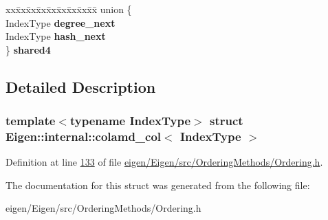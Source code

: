 \begin{DoxyCompactItemize}
\begin{tabbing}
\end{tabbing}\item 
\mbox{\label{struct_eigen_1_1internal_1_1colamd__col_a56cd262d1c36528bf2ea6748bfc588d3}} 
\begin{tabbing}
xx\=xx\=xx\=xx\=xx\=xx\=xx\=xx\=xx\=\kill
union \{\\
\>IndexType {\bfseries degree\_next}\\
\>IndexType {\bfseries hash\_next}\\
\} {\bfseries shared4}\\

\end{tabbing}\end{DoxyCompactItemize}


\subsection{Detailed Description}
\subsubsection*{template$<$typename Index\+Type$>$\newline
struct Eigen\+::internal\+::colamd\+\_\+col$<$ Index\+Type $>$}



Definition at line \hyperlink{eigen_2_eigen_2src_2_ordering_methods_2_ordering_8h_source_l00133}{133} of file \hyperlink{eigen_2_eigen_2src_2_ordering_methods_2_ordering_8h_source}{eigen/\+Eigen/src/\+Ordering\+Methods/\+Ordering.\+h}.



The documentation for this struct was generated from the following file\+:\begin{DoxyCompactItemize}
\item 
eigen/\+Eigen/src/\+Ordering\+Methods/\+Ordering.\+h\end{DoxyCompactItemize}
